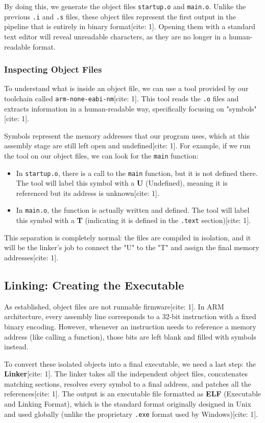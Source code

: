 By doing this, we generate the object files \texttt{startup.o} and \texttt{main.o}. Unlike the previous \texttt{.i} and \texttt{.s} files, these object files represent the first output in the pipeline that is entirely in binary format[cite: 1]. Opening them with a standard text editor will reveal unreadable characters, as they are no longer in a human-readable format.


\subsubsection{Inspecting Object Files}
To understand what is inside an object file, we can use a tool provided by our toolchain called \texttt{arm-none-eabi-nm}[cite: 1]. This tool reads the \texttt{.o} files and extracts information in a human-readable way, specifically focusing on "symbols"[cite: 1]. 

Symbols represent the memory addresses that our program uses, which at this assembly stage are still left open and undefined[cite: 1]. For example, if we run the tool on our object files, we can look for the \texttt{main} function:
\begin{itemize}
    \item In \texttt{startup.o}, there is a call to the \texttt{main} function, but it is not defined there. The tool will label this symbol with a \textbf{U} (Undefined), meaning it is referenced but its address is unknown[cite: 1].
    \item In \texttt{main.o}, the function is actually written and defined. The tool will label this symbol with a \textbf{T} (indicating it is defined in the \texttt{.text} section)[cite: 1].
\end{itemize}
This separation is completely normal: the files are compiled in isolation, and it will be the linker's job to connect the "U" to the "T" and assign the final memory addresses[cite: 1].

\subsection{Linking: Creating the Executable}
As established, object files are not runnable firmware[cite: 1]. In ARM architecture, every assembly line corresponds to a 32-bit instruction with a fixed binary encoding. However, whenever an instruction needs to reference a memory address (like calling a function), those bits are left blank and filled with symbols instead. 

To convert these isolated objects into a final executable, we need a last step: the \textbf{Linker}[cite: 1]. The linker takes all the independent object files, concatenates matching sections, resolves every symbol to a final address, and patches all the references[cite: 1]. The output is an executable file formatted as \textbf{ELF} (Executable and Linking Format), which is the standard format originally designed in Unix and used globally (unlike the proprietary \texttt{.exe} format used by Windows)[cite: 1].

